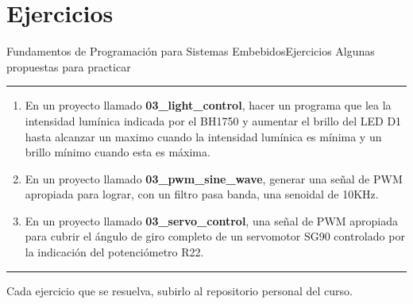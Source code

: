 \documentclass[aspectratio=169, xcolor=dvipsnames]{beamer}
\begin{document}
\section{Ejercicios}
\begin{frame}{Fundamentos de Programación para Sistemas Embebidos}{Ejercicios}
    Algunas propuestas para practicar
    \noindent\rule{\textwidth}{0.75pt}
    \begin{enumerate}
        \item En un proyecto llamado \textbf{03\_light\_control}, hacer un programa que lea la intensidad lumínica indicada por el BH1750 y aumentar el brillo del LED D1 hasta alcanzar un maximo cuando la intensidad lumínica es mínima y un brillo mínimo cuando esta es máxima.
        \item En un proyecto llamado \textbf{03\_pwm\_sine\_wave}, generar una señal de PWM apropiada para lograr, con un filtro pasa banda, una senoidal de 10KHz.
        \item En un proyecto llamado \textbf{03\_servo\_control}, una señal de PWM apropiada para cubrir el ángulo de giro completo de un servomotor SG90 controlado por la indicación del potenciómetro R22.
    \end{enumerate}
    \noindent\rule{\textwidth}{0.75pt}
    Cada ejercicio que se resuelva, subirlo al repositorio personal del curso.
\end{frame}
\end{document}
